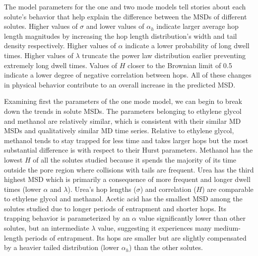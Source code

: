 \documentclass[journal=jctcce,manuscript=article]{achemso}
\begin{document}
  The model parameters for the one and two mode models tell stories about each
  solute's behavior that help explain the difference between the MSDs of
  different solutes. Higher values of $\sigma$ and lower values of $\alpha_h$
  indicate larger average hop length magnitudes by increasing the hop length
  distribution's width and tail density respectively. Higher values of $\alpha$
  indicate a lower probability of long dwell times. Higher values of $\lambda$
  truncate the power law distribution earlier preventing extremely long dwell
  times. Values of $H$ closer to the Brownian limit of 0.5 indicate a lower
  degree of negative correlation between hops. All of these changes in physical
  behavior contribute to an overall increase in the predicted MSD.

  Examining first the parameters of the one mode model, we can begin to break
  down the trends in solute MSDs. The parameters belonging to ethylene glycol
  and methanol are relatively similar, which is consistent with their similar MD
  MSDs and qualitatively similar MD time series.
  Relative to ethylene glycol, methanol tends to stay trapped for less
  time and takes larger hops but the most substantial difference is with
  respect to their Hurst parameters. Methanol has the lowest $H$ of all the
  solutes studied because it spends the majority of its time outside the pore
  region where collisions with tails are frequent.
  Urea has the third highest MSD which is primarily a consequence of more
  frequent and longer dwell times (lower $\alpha$ and $\lambda$). Urea's hop
  lengths ($\sigma$) and correlation ($H$) are comparable to ethylene glycol
  and methanol. Acetic acid has the smallest MSD among the solutes studied due
  to longer periods of entrapment and shorter hops. Its trapping behavior is
  parameterized by an $\alpha$ value significantly lower than other solutes,
  but an intermediate $\lambda$ value, suggesting it experiences many
  medium-length periods of entrapment. Its hops are smaller but are slightly
  compensated by a heavier tailed distribution (lower $\alpha_h$) than the
  other solutes. 
  
\end{document}
